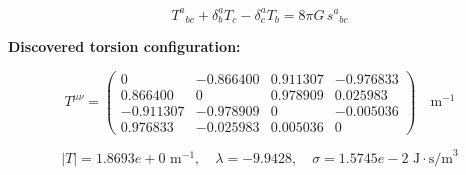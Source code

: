
\begin{equation}
  T^a{}_{bc} + \delta^a_b T_c - \delta^a_c T_b = 8\pi G \, s^a{}_{bc}
\end{equation}

\textbf{Discovered torsion configuration:}

\begin{equation}
  T^{\mu\nu} = \begin{pmatrix}
    0 & -0.866400 & 0.911307 & -0.976833 \\
    0.866400 & 0 & 0.978909 & 0.025983 \\
    -0.911307 & -0.978909 & 0 & -0.005036 \\
    0.976833 & -0.025983 & 0.005036 & 0
  \end{pmatrix} \quad \text{m}^{-1}
\end{equation}

\begin{equation}
  |T| = 1.8693e+0 \text{ m}^{-1}, \quad
  \lambda = -9.9428, \quad
  \sigma = 1.5745e-2 \text{ J}\cdot\text{s/m}^3
\end{equation}